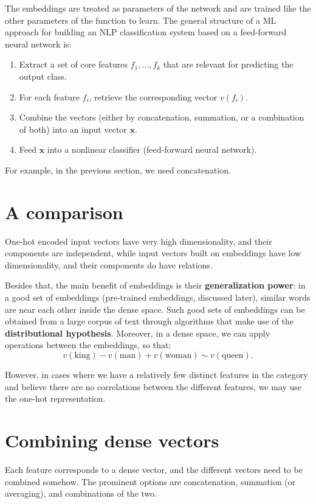 The embeddings are treated as parameters of the network and are trained like the other parameters of the function to learn. The general structure of a ML approach for building an NLP classification system based on a feed-forward neural network is:
\begin{enumerate}
    \item Extract a set of core features \( f_{1}, \dots, f_{k} \) that are relevant for predicting the output class.
    \item For each feature \( f_{i} \), retrieve the corresponding vector \( v(f_{i}) \).
    \item Combine the vectors (either by concatenation, summation, or a combination of both) into an input vector \(\mathbf{x}\).
    \item Feed \(\mathbf{x}\) into a nonlinear classifier (feed-forward neural network).
\end{enumerate}

For example, in the previous section, we used concatenation.

\section{A comparison}
One-hot encoded input vectors have very high dimensionality, and their components are independent, while input vectors built on embeddings have low dimensionality, and their components do have relations.

Besides that, the main benefit of embeddings is their \textbf{generalization power}: in a good set of embeddings (pre-trained embeddings, discussed later), similar words are near each other inside the dense space. Such good sets of embeddings can be obtained from a large corpus of text through algorithms that make use of the \textbf{distributional hypothesis}. Moreover, in a dense space, we can apply operations between the embeddings, so that:
\[
v(\text{king}) - v(\text{man}) + v(\text{woman}) \sim v(\text{queen}).
\]

However, in cases where we have a relatively few distinct features in the category and believe there are no correlations between the different features, we may use the one-hot representation.

\section{Combining dense vectors}
Each feature corresponds to a dense vector, and the different vectors need to be combined somehow. The prominent options are concatenation, summation (or averaging), and combinations of the two.


